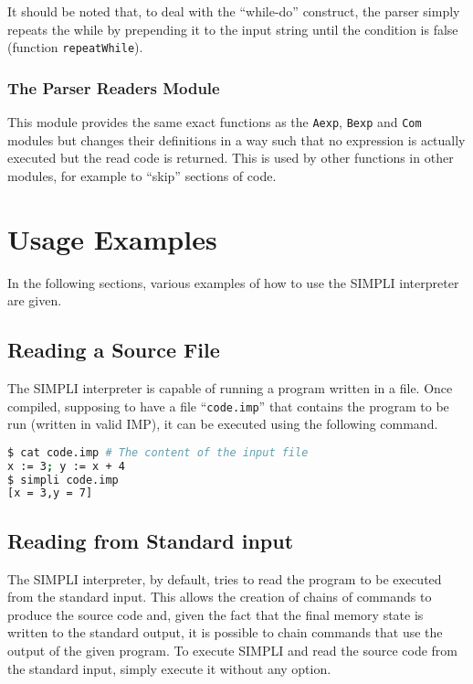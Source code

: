 \documentclass{esposito-documentation}
\begin{document}


It should be noted that, to deal with the ``while-do'' construct, the parser
simply repeats the while by prepending it to the input string until the
condition is false (function \lstinline|repeatWhile|).

\subsection{The Parser Readers Module}


This module provides the same exact functions as the \texttt{Aexp},
\texttt{Bexp} and \texttt{Com} modules but changes their definitions in a way
such that no expression is actually executed but the read code is returned.
This is used by other functions in other modules, for example to ``skip''
sections of code.


\chapter{Usage Examples}

In the following sections, various examples of how to use the SIMPLI
interpreter are given.

\section{Reading a Source File}

The SIMPLI interpreter is capable of running a program written in a file. Once
compiled, supposing to have a file ``\texttt{code.imp}'' that contains the
program to be run (written in valid IMP), it can be executed using the
following command.

\begin{lstlisting}[language=sh,numbers=none]
$ cat code.imp # The content of the input file
x := 3; y := x + 4
$ simpli code.imp
[x = 3,y = 7]
\end{lstlisting}

\section{Reading from Standard input}

The SIMPLI interpreter, by default, tries to read the program to be executed
from the standard input. This allows the creation of chains of commands to
produce the source code and, given the fact that the final memory state is
written to the standard output, it is possible to chain commands that use the
output of the given program. To execute SIMPLI and read the source code from
the standard input, simply execute it without any option.
\end{document}
